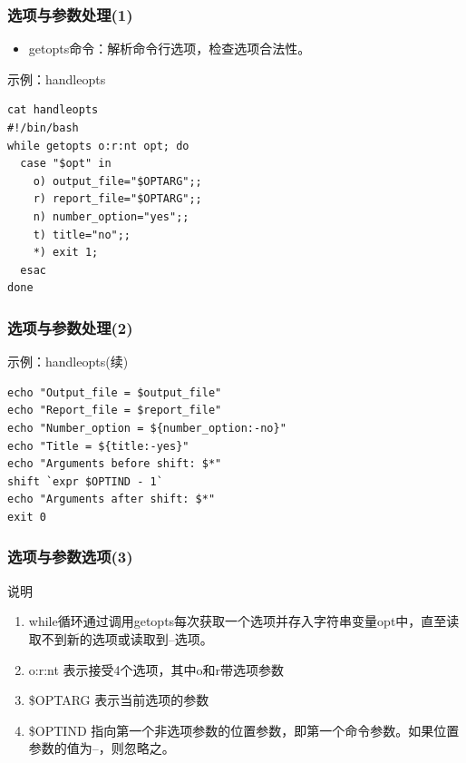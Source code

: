 \documentclass[xcolor=svgnames,presentation]{beamer}
\begin{document}
\begin{frame}[fragile]
\frametitle{选项与参数处理(1)}
\label{sec-1-3-16}
\begin{itemize}

\item getopts命令：解析命令行选项，检查选项合法性。
\label{sec-1-3-16-1}%
\end{itemize} %
\begin{exampleblock}{示例：handleopts}
\label{sec-1-3-16-2}


\begin{verbatim}
cat handleopts
#!/bin/bash
while getopts o:r:nt opt; do
  case "$opt" in
    o) output_file="$OPTARG";;
    r) report_file="$OPTARG";;
    n) number_option="yes";;
    t) title="no";;
    *) exit 1;
  esac
done
\end{verbatim}
\end{exampleblock}
\end{frame}
\begin{frame}[fragile]
\frametitle{选项与参数处理(2)}
\label{sec-1-3-17}
\begin{exampleblock}{示例：handleopts(续)}
\label{sec-1-3-17-1}


\begin{verbatim}
echo "Output_file = $output_file"
echo "Report_file = $report_file"
echo "Number_option = ${number_option:-no}"
echo "Title = ${title:-yes}"
echo "Arguments before shift: $*"
shift `expr $OPTIND - 1`
echo "Arguments after shift: $*"
exit 0
\end{verbatim}
\end{exampleblock}
\end{frame}
\begin{frame}
\frametitle{选项与参数选项(3)}
\label{sec-1-3-18}
\begin{exampleblock}{说明}
\label{sec-1-3-18-1}

\begin{enumerate}
\item while循环通过调用getopts每次获取一个选项并存入字符串变量opt中，直至读取不到新的选项或读取到--选项。
\item o:r:nt  表示接受4个选项，其中o和r带选项参数
\item \$OPTARG 表示当前选项的参数
\item \$OPTIND 指向第一个非选项参数的位置参数，即第一个命令参数。如果位置参数的值为--，则忽略之。
\end{enumerate}
\end{exampleblock}
\end{frame}
\end{document}
